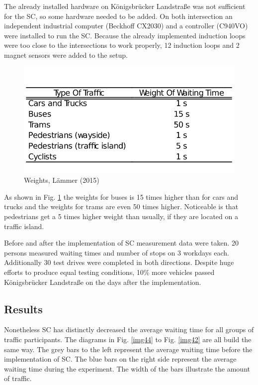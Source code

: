 The already installed hardware on K\"onigsbr\"ucker Landstra{\ss}e was not sufficient for the SC, so some hardware needed to be added.
On both intersection an independent industrial computer (Beckhoff CX2030) and a controller (C940VO) were installed to run the SC. Because the already implemented induction loops were too close to the intersections to work properly, 12 induction loops and 2 magnet sensors were added to the setup.

\begin{figure} [!htb]
	\centering
	\includegraphics[scale=0.32]{pic/weighting.png}
	\caption{Weights, L\"ammer (2015) \cite{laemmer15}}
	\label{img66}
\end{figure}

As shown in Fig. \ref{img66} the weights for buses is 15 times higher than for cars and trucks and the weights for trams are even 50 times higher. Noticeable is that pedestrians get a 5 times higher weight than usually, if they are located on a traffic island.

Before and after the implementation of SC measurement data were taken. 20 persons measured waiting times and number of stops on 3 workdays each. Additionally 30 test drives were completed in both directions. Despite huge efforts to produce equal testing conditions, 10\% more vehicles passed K\"onigsbr\"ucker Landstra{\ss}e on the days after the implementation.

\subsection{Results}

Nonetheless SC has distinctly decreased the average waiting time for all groups of traffic participants. The diagrams in Fig. \ref{img44} to Fig. \ref{img42} are all build the same way. The grey bars to the left represent the average waiting time before the implementation of SC. The blue bars on the right side represent the average waiting time during the experiment. The width of the bars illustrate the amount of traffic.


